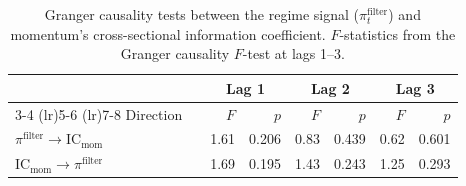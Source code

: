 \begin{table}[htbp]
\centering
\caption{Granger causality tests between the regime signal ($\pi_t^{\text{filter}}$) and momentum's cross-sectional information coefficient. $F$-statistics from the Granger causality $F$-test at lags 1--3.}
\label{tab:granger}
\begin{tabular}{l c r r r r r r}
\toprule
 & & \multicolumn{2}{c}{Lag 1} & \multicolumn{2}{c}{Lag 2} & \multicolumn{2}{c}{Lag 3} \\
\cmidrule(lr){3-4} \cmidrule(lr){5-6} \cmidrule(lr){7-8}
Direction & & $F$ & $p$ & $F$ & $p$ & $F$ & $p$ \\
\midrule
$\pi^{\text{filter}} \to \text{IC}_{\text{mom}}$ & & 1.61 & 0.206 & 0.83 & 0.439 & 0.62 & 0.601 \\
$\text{IC}_{\text{mom}} \to \pi^{\text{filter}}$ & & 1.69 & 0.195 & 1.43 & 0.243 & 1.25 & 0.293 \\
\bottomrule
\end{tabular}
\end{table}